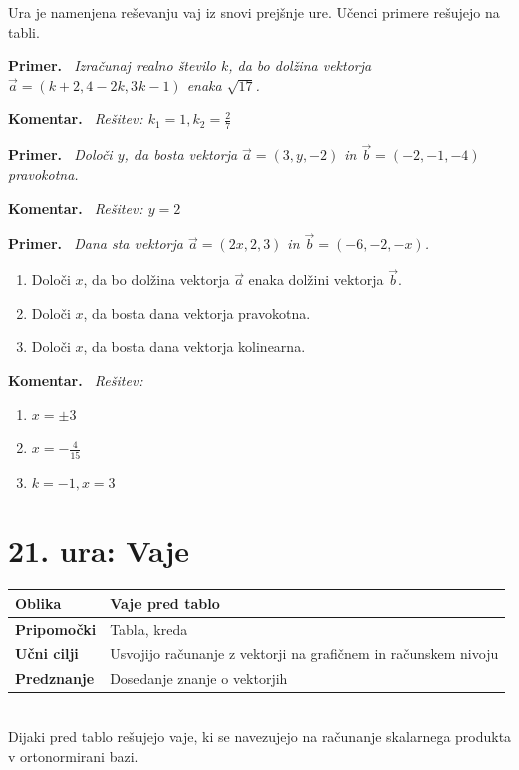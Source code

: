 \documentclass[a4paper,11pt]{article}
\newenvironment{komentar}{%
  \par\medskip\noindent\textbf{Komentar.}\itshape\ }{\par\medskip}
\newenvironment{primer}{%
  \par\medskip\noindent\textbf{Primer.}\itshape\ }{\par\medskip}
\begin{document}
Ura je namenjena reševanju vaj iz snovi prejšnje ure. Učenci primere rešujejo na tabli.
\begin{primer}
    Izračunaj realno število $k$, da bo dolžina vektorja $\vec{a}=(k+2,4-2k,3k-1)$ enaka $\sqrt{17}$.
\end{primer}
\begin{komentar}
    Rešitev: $k_1 = 1, k_2= \frac{2}{7}$
\end{komentar}
\begin{primer}
    Določi $y$, da bosta vektorja $\vec{a}=(3,y,-2)$ in $\vec{b}=(-2,-1,-4)$ pravokotna. 
\end{primer}
\begin{komentar}
    Rešitev: $y=2$
\end{komentar}
\begin{primer}
    Dana sta vektorja $\vec{a}=(2x,2,3)$ in $\vec{b}=(-6,-2,-x)$.
    \begin{enumerate}
        \item Določi $x$, da bo dolžina vektorja $\vec{a}$ enaka dolžini vektorja $\vec{b}$.
        \item Določi $x$, da bosta dana vektorja pravokotna.
        \item Določi $x$, da bosta dana vektorja kolinearna.
    \end{enumerate}
\end{primer}
\begin{komentar}
    Rešitev:
    \begin{enumerate}
        \item $x=\pm 3$
        \item $x=-\frac{4}{15}$
        \item $k=-1, x=3$
    \end{enumerate}
\end{komentar}
\newpage
\section{21. ura: Vaje }
\begin{tabularx}{\textwidth}{|>{\bfseries\RaggedRight}p{2.7cm}|X|}
\hline
Oblika & Vaje pred tablo \\ \hline
Pripomočki & Tabla, kreda \\ \hline
Učni cilji & Usvojijo računanje z vektorji na grafičnem in računskem nivoju \\ \hline
Predznanje & Dosedanje znanje o vektorjih \\ \hline

\end{tabularx}
\\

Dijaki pred tablo rešujejo vaje, ki se navezujejo na računanje skalarnega produkta v ortonormirani bazi.
\end{document}

